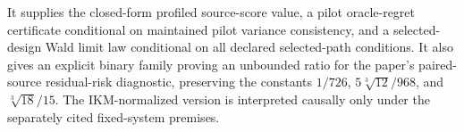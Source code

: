 It supplies the closed-form profiled source-score value, a pilot oracle-regret certificate conditional on maintained pilot variance consistency, and a selected-design Wald limit law conditional on all declared selected-path conditions.  It also gives an explicit binary family proving an unbounded ratio for the paper's paired-source residual-risk diagnostic, preserving the constants \(1/726\), \(5\sqrt[3]{12}/968\), and \(\sqrt[3]{18}/15\).  The IKM-normalized version is interpreted causally only under the separately cited fixed-system premises.